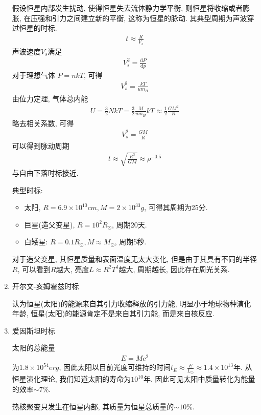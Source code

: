 \begin{enumerate}
    假设恒星内部发生扰动, 使得恒星失去流体静力学平衡, 则恒星将收缩或者膨胀, 在压强和引力之间建立新的平衡, 这称为恒星的脉动. 其典型周期为声波穿过恒星的时标. 
    \begin{align*}
        t\approx \frac{R}{V_s}
    \end{align*}
    声波速度$V_s$满足
    \begin{align*}
        V_s^2=\frac{\mathrm{d}P}{\mathrm{d}p}
    \end{align*}
    对于理想气体 $P=nkT$, 可得
    \begin{align*}
        V_s^2=\frac{kT}{um_H}
    \end{align*}
    由位力定理, 气体总内能
    \begin{align*}
        U=\frac{3}{2}NkT=\frac{3}{2}\frac{M}{um_H}kT\approx \frac{1}{2}\frac{GM^2}{R}
    \end{align*}
    略去相关系数, 可得
    \begin{align*}
        V_s^2=\frac{GM}{R}
    \end{align*}
    可以得到脉动周期
    \begin{align*}
        t\approx\sqrt{\frac{R^3}{GM}}\approx \rho^{-0.5}
    \end{align*}
    与自由下落时标接近. 

    典型时标: 
    \begin{itemize}
        \item 太阳, $R=6.9\times10^{10} cm, M=2\times10^{33} g$, 可得其周期为25分. 
        \item 巨星(造父变星), $R=10^2R_{\odot}$, 周期20天. 
        \item 白矮星: $R=0.1R_{\odot}, M\approx M_{\odot}$, 周期5秒. 
    \end{itemize}
    对于造父变星, 其恒星质量和表面温度无太大变化, 但是由于其具有不同的半径$R$, 可以看到$R$越大, 亮度$L\approx R^2T^4$越大, 周期越长, 因此存在周光关系. 

    \item 开尔文-亥姆霍兹时标
    
    认为恒星(太阳)的能源来自其引力收缩释放的引力能, 明显小于地球物种演化年龄, 恒星(太阳)的能源肯定不是来自其引力能, 而是来自核反应. 
    \item 爱因斯坦时标
    
    太阳的总能量
    \begin{align*}
        E=Mc^2
    \end{align*}
    为$1.8\times 10^{54} erg$, 因此太阳以目前光度可维持的时间$t_E \approx \frac{E}{L_{\odot}} \approx 1.4\times10^{13} $年. 从恒星演化理论, 我们知道太阳的寿命为$10^{10}$年. 因此可见太阳中质量转化为能量的效率$\sim 7\%$. 
    
    热核聚变只发生在恒星内部, 其质量为恒星总质量的$\sim 10\%$. 
\end{enumerate}

